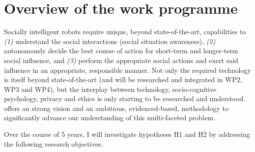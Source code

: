 \section{Overview of the \project work programme}

Socially intelligent robots require unique, beyond state-of-the-art,
capabilities to \emph{(1)} understand the social interactions (social
situation awareness), \emph{(2)} autonomously decide the best course of action for
short-term and longer-term social influence, and \emph{(3)} perform the
appropriate social actions and exert said influence in an appropriate,
responsible manner.
Not only the required technology is itself beyond state-of-the-art (and will be
researched and integrated in WP2, WP3 and WP4), but the
interplay between technology, socio-cognitive psychology, privacy and ethics is
only starting to be researched and understood. \project offers an
strong vision and an ambitious, evidenced-based, methodology to significantly
advance our understanding of this multi-faceted problem.

Over the course of 5 years, I will investigate hypotheses H1 and H2
by addressing the following research objectives:

